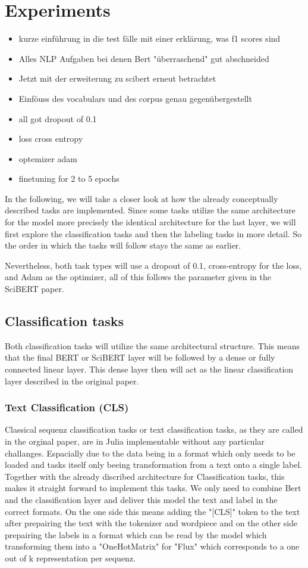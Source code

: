 \chapter{Experiments}
\begin{itemize}
	\item kurze einführung in die test fälle mit einer erklärung, was f1 scores sind
	\item Alles NLP Aufgaben bei denen Bert "überraschend" gut abschneided
	\item Jetzt mit der erweiterung zu scibert erneut betrachtet
	\item Einföuss des vocabulars und des corpus genau gegenübergestellt
	\item all got dropout of 0.1
	\item loss cross entropy
	\item optemizer adam
	\item finetuning for 2 to 5 epochs 
\end{itemize}
In the following, we will take a closer look at how the already conceptually described tasks are implemented. Since some tasks utilize the same architecture for the model more precisely the identical architecture for the last layer, we will first explore the classification tasks and then the labeling tasks in more detail. So the order in which the tasks will follow stays the same as earlier.

Nevertheless, both task types will use a dropout of 0.1, cross-entropy for the loss, and Adam as the optimizer, all of this follows the parameter given in the SciBERT paper.

\section{Classification tasks}
Both classification tasks will utilize the same architectural structure. This means that the final BERT or SciBERT layer will be followed by a dense or fully connected linear layer. This dense layer then will act as the linear classification layer described in the original paper. 
\subsection{Text Classification (CLS)}
Classical sequenz classification tasks or text classification tasks, as they are called in the orginal paper, are in Julia implementable without any particular challanges. Espacially due to the data being in a format which only needs to be loaded and tasks itself only beeing transformation from a text onto a single label. Together with the already discribed architecture for Classification tasks, this makes it straight forward to implement this tasks. We only need to combine Bert and the classification layer and deliver this model the text and label in the correct formats. On the one side this means adding the "[CLS]" token to the text after prepairing the text with the tokenizer and wordpiece and on the other side prepairing the labels in a format which can be read by the model which transforming them into a "OneHotMatrix" for "Flux" which corresponds to a one out of k representation per sequenz.
